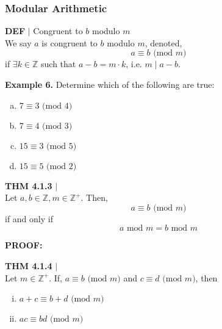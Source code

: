 \documentclass [12pt]{article}
\begin{document}
\subsubsection*{Modular Arithmetic}
\begin{framed}
\textbf{DEF} $|$ Congruent to $b$ modulo $m$\\
\vspace{0.5cm}
We say $a$ is congruent to $b$ modulo $m$, denoted,
\[a \equiv b \text{ (mod }m)\]
if $\exists k \in \mathbb{Z}$ such that $a - b = m \cdot k$, i.e. $m\;|\; a - b$.
\end{framed}
\vspace{0.5cm}
\raggedright
\textbf{Example 6.} Determine which of the following are true:
\begin{multicols}{2}
\begin{enumerate}[(a)]
\item $7 \equiv 3 \text{ (mod }4)$ \vspace{1cm}
\item $7 \equiv 4 \text{ (mod }3)$ \columnbreak
\item $15 \equiv 3 \text{ (mod }5)$ \vspace{1cm}
\item $15 \equiv 5 \text{ (mod }2)$
\end{enumerate}
\end{multicols}
\vspace{1cm}
\begin{framed}
\textbf{THM 4.1.3} $|$ \\
\vspace{0.5cm}
Let $a, b \in \mathbb{Z}, m \in \mathbb{Z}^{+}$. Then, \\
\[a \equiv b \text{ (mod }m) \]
if and only if
\[a \text{ mod } m = b \text{ mod } m\]
\end{framed}
\raggedright
\textbf{PROOF:}
\pagebreak
\begin{framed}
\textbf{THM 4.1.4} $|$ \\
\vspace{0.5cm}
Let $m \in \mathbb{Z}^{+}$. If, $a \equiv b \text{ (mod }m) $ and $c \equiv d \text{ (mod }m) $, then\\
\begin{enumerate}[(i)]
\item $a+c \equiv b+d \text{ (mod } m)$
\item $ac \equiv bd \text{ (mod } m)$
\end{enumerate}
\end{framed}
\end{document}
